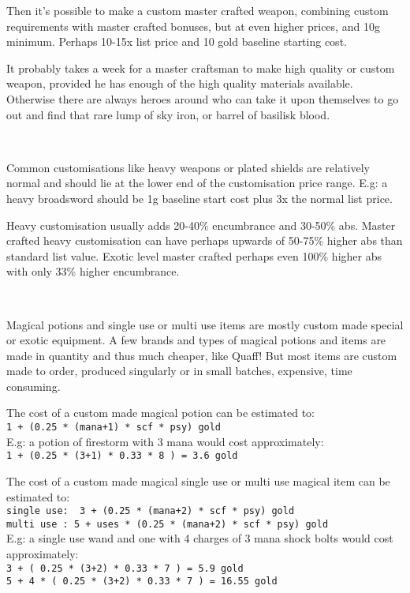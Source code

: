 Then it's possible to make a custom master crafted weapon, combining custom requirements with master crafted bonuses, but at even higher prices, and 10g minimum. Perhaps 10-15x list price and 10 gold baseline starting cost.

It probably takes a week for a master craftsman to make high quality or custom weapon, provided he has enough of the high quality materials available. Otherwise there are always heroes around who can take it upon themselves to go out and find that rare lump of sky iron, or barrel of basilisk blood.

\

Common customisations like heavy weapons or plated shields are relatively normal and should lie at the lower end of the customisation price range. E.g: a heavy broadsword should be 1g baseline start cost plus 3x the normal list price.

Heavy customisation usually adds 20-40\% encumbrance and 30-50\% abs. Master crafted heavy customisation can have perhaps upwards of 50-75\% higher abs than standard list value. Exotic level master crafted perhaps even 100\% higher abs with only 33\% higher encumbrance.

\

Magical potions and single use or multi use items are mostly custom made special or exotic equipment. A few brands and types of magical potions and items are made in quantity and thus much cheaper, like Quaff! But most items are custom made to order, produced singularly or in small batches, expensive, time consuming.

\noindent
The cost of a custom made magical potion can be estimated to:\\
\verb|1 + (0.25 * (mana+1) * scf * psy) gold| \\
E.g: a potion of firestorm with 3 mana would cost approximately:\\
\verb|1 + (0.25 * (3+1) * 0.33 * 8 ) = 3.6 gold|

\noindent
The cost of a custom made magical single use or multi use magical item can be estimated to: \\
\verb|single use:  3 + (0.25 * (mana+2) * scf * psy) gold| \\
\verb|multi use : 5 + uses * (0.25 * (mana+2) * scf * psy) gold| \\
E.g: a single use wand and one with 4 charges of 3 mana shock bolts would cost approximately: \\
\verb|3 + ( 0.25 * (3+2) * 0.33 * 7 ) = 5.9 gold| \\            %
\verb|5 + 4 * ( 0.25 * (3+2) * 0.33 * 7 ) = 16.55 gold|         %

